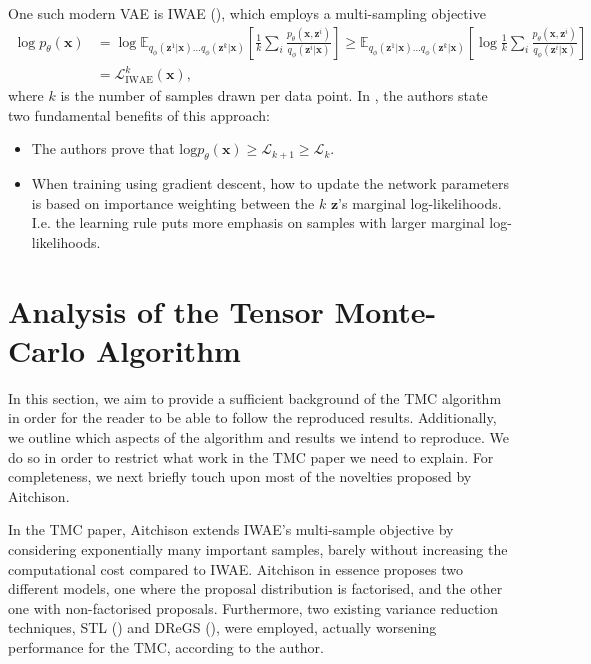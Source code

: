 One such modern VAE is IWAE (\cite{iwae}), which employs a multi-sampling objective 
\begin{equation}
\begin{split}
    \log p_{\theta}(\bm x) &= \log \mathbb E_{q_{\phi}(\bm z^1|\bm x)…q_{\phi}(\bm z^k|\bm x)} \left[\frac{1}{k}\sum_i\frac{p_{\theta}(\bm x, \bm z^i)}{q_{\phi}(\bm z^i|\bm x)}\right]
\label{eq:IWAE_loss}
    \geq \mathbb E_{q_{\phi}(\bm z^1|\bm x)…q_{\phi}(\bm z^k|\bm x)} \left[\log\frac{1}{k}\sum_i\frac{p_{\theta}(\bm x, \bm z^i)}{q_{\phi}(\bm z^i|\bm x)}\right]\\ 
    &= \mathcal{L}^k_{\text{IWAE}}(\bm x),
    \end{split}
\end{equation}
where $k$ is the number of samples drawn per data point. In \cite{iwae}, the authors state two fundamental benefits of this approach:
\begin{itemize}
    \item The authors prove that $\text{log} p_{\theta}(\bm x) \geq \mathcal{L}_{k+1}\geq \mathcal{L}_k$.
    \item When training using gradient descent, how to update the network parameters is based on importance weighting between the $k$ $\bm z$'s marginal log-likelihoods. I.e. the learning rule puts more emphasis on samples with larger marginal log-likelihoods.
\end{itemize}

\section{Analysis of the Tensor Monte-Carlo Algorithm}
In this section, we aim to provide a sufficient background of the TMC algorithm in order for the reader to be able to follow the reproduced results. Additionally, we outline which aspects of the algorithm and results we intend to reproduce.
We do so in order to restrict what work in the TMC paper we need to explain.
 For completeness, we next briefly touch upon most of the novelties proposed by Aitchison.

In the TMC paper, Aitchison extends IWAE's multi-sample objective by considering exponentially many important samples, barely without increasing the computational cost compared to IWAE. Aitchison in essence proposes two different models, one where the proposal distribution is factorised, and the other one with non-factorised proposals. Furthermore, two existing variance reduction techniques, STL (\cite{roeder2017sticking}) and DReGS (\cite{tucker2018doubly}), were employed, actually worsening performance for the TMC, according to the author. 

